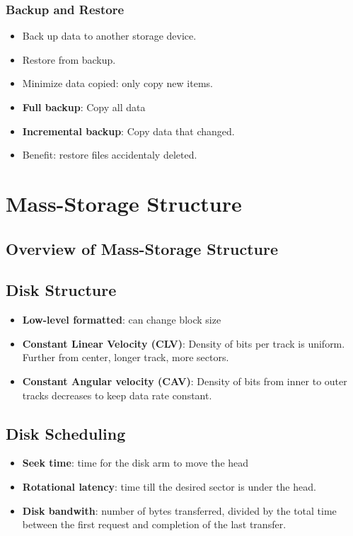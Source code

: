 \documentclass[10pt]{report}
\begin{document}
		\subsection{Backup and Restore}
			\begin{itemize}
				\item Back up data to another storage device.
				\item Restore from backup.
				\item Minimize data copied: only copy new items.
				\item \textbf{Full backup}: Copy all data
				\item \textbf{Incremental backup}: Copy data that changed.
				\item Benefit: restore files accidentaly deleted.
			\end{itemize}


\chapter{Mass-Storage Structure} \label{ch:Chapter12}
	\section{Overview of Mass-Storage Structure}

	\section{Disk Structure}
		\begin{itemize}
			\item \textbf{Low-level formatted}: can change block size
			\item \textbf{Constant Linear Velocity (CLV)}: Density of bits per track is uniform. Further from center, longer track, more sectors.
			\item \textbf{Constant Angular velocity (CAV)}: Density of bits from inner to outer tracks decreases to keep data rate constant.
		\end{itemize}

	\section{Disk Scheduling}
		\begin{itemize}
			\item \textbf{Seek time}: time for the disk arm to move the head
			\item \textbf{Rotational latency}: time till the desired sector is under the head.
			\item \textbf{Disk bandwith}: number of bytes transferred, divided by the total time between the first request and completion of the last transfer.
		\end{itemize}
\end{document}
